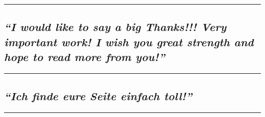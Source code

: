 \begin{center}\rule{0.5\linewidth}{\linethickness}\end{center}

\hypertarget{i-would-like-to-say-a-big-thanks-very-important-work-i-wish-you-great-strength-and-hope-to-read-more-from-you}{%
\subsection{\texorpdfstring{\emph{``I would like to say a big Thanks!!!
Very important work! I wish you great strength and hope to read more
from
you!''}}{``I would like to say a big Thanks!!! Very important work! I wish you great strength and hope to read more from you!''}}\label{i-would-like-to-say-a-big-thanks-very-important-work-i-wish-you-great-strength-and-hope-to-read-more-from-you}}

\begin{center}\rule{0.5\linewidth}{\linethickness}\end{center}

\hypertarget{ich-finde-eure-seite-einfach-toll}{%
\subsection{\texorpdfstring{\emph{``Ich finde eure Seite einfach
toll!''}}{``Ich finde eure Seite einfach toll!''}}\label{ich-finde-eure-seite-einfach-toll}}

\begin{center}\rule{0.5\linewidth}{\linethickness}\end{center}

